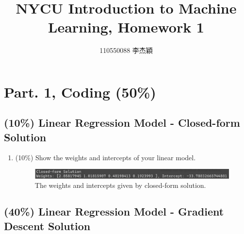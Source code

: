 \documentclass[twocolumn]{extarticle}
\title{NYCU Introduction to Machine Learning, Homework 1}
\author{110550088 李杰穎}
\date{}
\begin{document}
\maketitle

\section{Part. 1, Coding (50\%)}
\subsection{(10\%) Linear Regression Model - Closed-form Solution}
\begin{enumerate}
\item (10\%)  Show the weights and intercepts of your linear model.
\begin{figure}[H]
\centering
\includegraphics[width=\linewidth]{closed_form_weights}
\caption{The weights and intercepts given by closed-form solution.}
\label{fig:closedformweights}
\end{figure}


\end{enumerate}

\subsection{(40\%) Linear Regression Model - Gradient Descent Solution}
\end{document}
